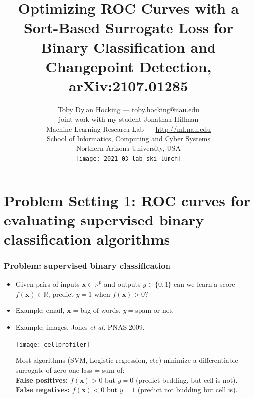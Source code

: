 \documentclass[t]{beamer}
\begin{document}
\title{Optimizing ROC Curves with a Sort-Based Surrogate Loss for Binary Classification and Changepoint Detection, arXiv:2107.01285}

\author{
  Toby Dylan Hocking --- toby.hocking@nau.edu\\ 
  joint work with my student Jonathan Hillman\\
  Machine Learning Research Lab --- \url{http://ml.nau.edu}\\
  School of Informatics, Computing and Cyber Systems\\
  Northern Arizona University, USA\\
  \texttt{[image: 2021-03-lab-ski-lunch]} \\
}

\date{}

\maketitle

\section{Problem Setting 1: ROC curves for evaluating supervised  binary classification algorithms}

\begin{frame}
  \frametitle{Problem: supervised binary classification}
  
  \begin{itemize}
  \item Given pairs of inputs $\mathbf x\in\mathbb R^p$ and outputs
    $y\in\{0,1\}$ can we learn a score 
    $f(\mathbf x)\in\mathbb R$, predict $y=1$ when $f(\mathbf x)>0$?
  \item Example: email, $\mathbf x =$bag of words, $y=$spam or not.
  \item Example: images. Jones {\it et al.} PNAS 2009.
    \parbox{2in}{\texttt{[image: cellprofiler]}}
    \parbox{1.9in}{Most algorithms (SVM, Logistic regression, etc) minimize a differentiable surrogate of zero-one loss = sum of:\\
      \textbf{False positives:} $f(\mathbf x)>0$ but $y=0$ (predict
      budding, but cell is not).\\
      \textbf{False negatives:} $f(\mathbf x)<0$ but $y=1$ (predict
      not budding but cell is).  }
  \end{itemize} 
\end{frame}
\end{document}
